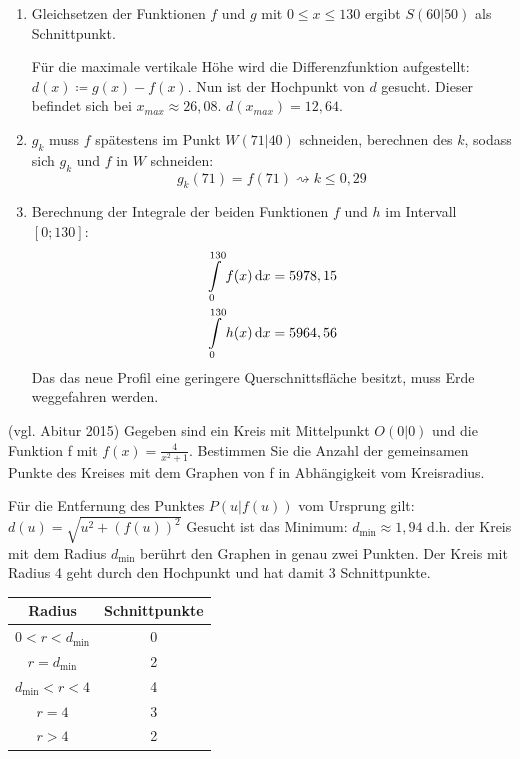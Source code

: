 \begin{lsg}{}
\begin{enumerate}
	\item Gleichsetzen der Funktionen $f$ und $g$ mit $0\leq x \leq 130$ ergibt $S(60|50)$ als Schnittpunkt.

	Für die maximale vertikale Höhe wird die Differenzfunktion aufgestellt: $d(x)\coloneqq g(x)-f(x)$. Nun ist der Hochpunkt von $d$ gesucht. Dieser befindet sich bei $x_{max}\approx26,08$. $d(x_{max})=12,64$.
	\item $g_k$ muss $f$ spätestens im Punkt $W(71|40)$ schneiden, berechnen des $k$, sodass sich $g_k$ und $f$ in $W$ schneiden:
	\begin{equation*}
		g_k(71)=f(71) \rightsquigarrow k\leq 0,29
	\end{equation*}
	\item Berechnung der Integrale der beiden Funktionen $f$ und $h$ im Intervall $[0;130]$:
	\begin{align*}
		\int\limits_0^{130} f(x)\,\mathrm{d} x &= 5978,15\\
		\int\limits_0^{130} h(x)\,\mathrm{d} x &= 5964,56
	\end{align*}
	Das das neue Profil eine geringere Querschnittsfläche besitzt, muss Erde weggefahren werden.
\end{enumerate}
\end{lsg}


\aufgabe{} (vgl. Abitur 2015)
Gegeben sind ein Kreis mit Mittelpunkt $O(0|0)$ und die Funktion f mit $f(x)=\frac{4}{x^2+1}$. Bestimmen Sie die Anzahl der gemeinsamen Punkte des Kreises mit dem Graphen von f in Abhängigkeit vom Kreisradius. 

\begin{lsg}{}
Für die Entfernung des Punktes $P(u|f(u))$ vom Ursprung gilt:
$d(u)=\sqrt{u^2+(f(u))^2}$ Gesucht ist das Minimum:
$d_{\mathrm{min}}\approx 1,94$ d.h. der Kreis mit dem Radius $d_{\mathrm{min}}$ berührt den Graphen in genau zwei Punkten.
Der Kreis mit Radius 4 geht durch den Hochpunkt und hat damit 3 Schnittpunkte.

\bigskip
\noindent
\begin{tabular}{c | c}
  Radius & Schnittpunkte\\
  \hline $0<r<d_{\mathrm{min}}$ & 0\\
  $r=d_{\mathrm{min}}$ & 2\\
  $d_{\mathrm{min}}<r<4$ & 4\\
  $r=4$ & 3\\
  $r>4$ & 2
\end{tabular}
\end{lsg}

